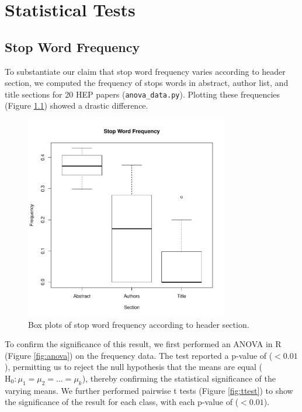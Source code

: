 
\chapter{Statistical Tests} %

\label{AppendixC} %


\section{Stop Word Frequency}
\label{sec:stopwordfrequency}
To substantiate our claim that stop word frequency varies according to header section, we computed the frequency of stops words in  abstract, author list, and title sections for 20 HEP papers (\texttt{anova\_data.py}). Plotting these frequencies (Figure \ref{fig:means}) showed a drastic difference.

\begin{figure}[!ht]
\center
\includegraphics[width=3.5in]{Figures/means.pdf}
\caption{Box plots of stop word frequency according to header section.}
\label{fig:means}
\end{figure}

To confirm the significance of this result, we first performed an ANOVA in R (Figure \ref{fig:anova}) on the frequency data. The test reported a p-value of ($< 0.01$), permitting us to reject the null hypothesis that the means are equal ($\text{H}_0: \mu_1 = \mu_2 = \dots = \mu_k$), thereby confirming the statistical significance of the varying means. We further performed pairwise t tests (Figure \ref{fig:ttest}) to show the significance of the result for each class, with each p-value of ($< 0.01$).

